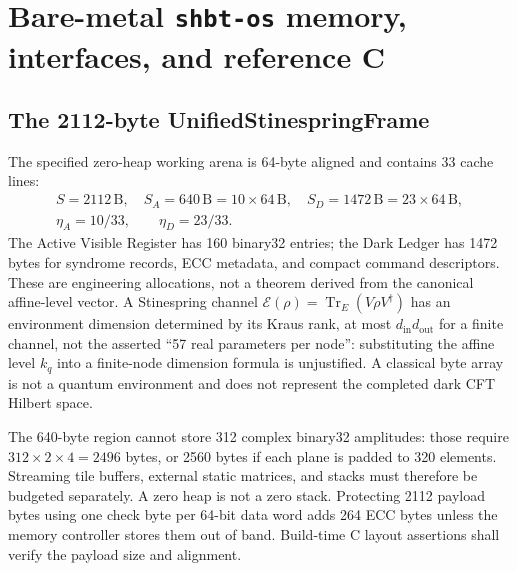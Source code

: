 \documentclass[11pt,a4paper]{article}
\newcommand{\Tr}{\operatorname{Tr}}
\newcommand{\unit}[1]{\,\mathrm{#1}}
\newcommand{\shbtos}{\texttt{shbt-os}}
\begin{document}
\section{Bare-metal \shbtos{} memory, interfaces, and reference C}
\label{sec:os}
\subsection{The 2112-byte UnifiedStinespringFrame}
\label{sec:os:arena}
The specified zero-heap working arena is 64-byte aligned and contains 33 cache lines:
\[
\begin{gathered}
 S=2112\unit B,\quad S_A=640\unit B=10\times64\unit B,\quad
 S_D=1472\unit B=23\times64\unit B,\\
 \eta_A=10/33,\qquad\eta_D=23/33.
\end{gathered}
\]
The Active Visible Register has 160 binary32 entries; the Dark Ledger has 1472 bytes for
syndrome records, ECC metadata, and compact command descriptors. These are engineering
allocations, not a theorem derived from the canonical affine-level vector. A Stinespring channel
$\mathcal E(\rho)=\Tr_E(V\rho V^\dagger)$ has an environment dimension determined by its
Kraus rank, at most $d_{\mathrm{in}}d_{\mathrm{out}}$ for a finite channel, not the asserted
``57 real parameters per node'': substituting the affine level $k_q$ into a finite-node
dimension formula is unjustified. A classical byte array is not a quantum environment and
does not represent the completed dark CFT Hilbert space.

The 640-byte region cannot store 312 complex binary32 amplitudes: those require
$312\times2\times4=2496$ bytes, or 2560 bytes if each plane is padded to 320 elements.
Streaming tile buffers, external static matrices, and stacks must therefore be budgeted
separately. A zero heap is not a zero stack. Protecting 2112 payload bytes using one check byte
per 64-bit data word adds 264 ECC bytes unless the memory controller stores them out of band.
Build-time C layout assertions shall verify the payload size and alignment.
\end{document}
